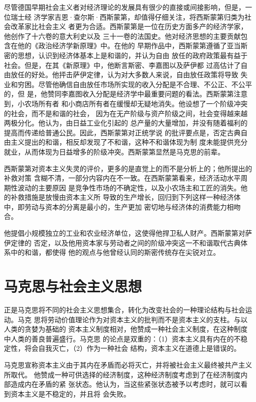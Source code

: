 尽管德国早期社会主义者对经济理论的发展具有很少的直接或间接影响，但是，一位瑞士经
济学家吉恩·查尔斯·西斯蒙第，却值得仔细关注，将西斯蒙第归类为社会改革家比社会主义
者更为合适。西斯蒙第是一位在历史方面多产的经济学家，他创作了十六卷的意大利史以及
三十一卷的法国史。他对经济思想的主要贡献包含在他的《政治经济学新原理》中。在他的
早期作品中，西斯蒙第遵循了亚当斯密的思想，认识到经济体基本上是和谐的，并认为自由
放任的政府政策最有益于社会。但是，在其《新原理》中，他断言斯密、李嘉图以及萨伊都
过高估计了自由放任的好处。他抨击萨伊定律，认为对大多数人来说，自由放任政策将导致
失业和穷困。尽管他确信自由放任市场所实现的收入分配是不合理、不公正、不公平的，但
是，他赞同李嘉图收入分配是经济学中最重要问题的看法。西斯蒙第注意到，小农场所有者
和小商店所有者在缓慢却无疑地消失。他设想了一个阶级冲突的社会，而不是和谐的社会，
因为在无产阶级与资产阶级之间，社会变得越来越两极分化。他认为，由日益工业化引起的
总产量的大量增加，并没有随着福利的提高而传递给普通公民。因此，西斯蒙第对正统学说
的批评要点是，否定古典自由主义提出的和谐，相反却发现了不和谐，这种不和谐体现为制
度未能提供充分就业，从而体现为日益增多的阶级冲突。西斯蒙第显然是马克思的前辈。

西斯蒙第对资本主义失灵的评价，更多的是直觉上的而不是分析上的；他所提出的补救对策
含糊不清，一部分内容内在不一致。在西斯蒙第看来，经济活动水平周期性波动的主要原因
是竞争性市场的不确定性，以及小农场主和工匠的消失。他的补救措施是放慢由资本主义所
导致的生产增长，回归到下列这样一种经济体中，即劳动与资本的分离是最小的，生产更加
密切地与经济体的消费能力相吻合。

他提倡小规模独立的工业和农业经济单位，这使得他捍卫私人财产。西斯蒙第对萨伊定律的
否定，以及他用资本家与劳动者之间的阶级冲突这一不和谐取代古典体系中的和谐，都使得
他的观点与他曾经认同的斯密传统存在尖锐对立。

\section{马克思与社会主义思想}

正是马克思将不同的社会主义思想集合，转化为改变社会的一种理论结构与社会运动。马克
思将劳动价值理论作为对资本主义的批判而不是资本主义的支柱。与以人类的贪婪为基础的
资本主义制度相对，他赞成一种社会主义制度，在这种制度中人类的善良普遍盛行。马克思
的论点是双重的：（1）资本主义具有内在的不稳定性，将会自我灭亡，（2）作为一种社会
结构，资本主义在道德上是错误的。

马克思宣称资本主义由于其内在矛盾而必将灭亡，并将被社会主义最终被共产主义所取代。
他赞成一种可供选择的经济制度，这种经济制度考虑到了在经济制度内部造成内在矛盾的紧
张状态。他认为，当这些紧张状态被予以考虑时，就可以看到资本主义是不稳定的，并且将
会失败。

